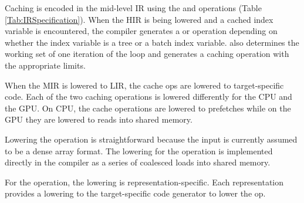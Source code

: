 Caching is encoded in the mid-level IR using the  and  operations (Table \ref{Tab:IRSpecification}). 
When the HIR is being lowered and a cached index variable is 
encountered, the compiler generates a  or  operation depending on 
whether the index variable is a tree or a batch index variable.
\Treebeard{} also determines the working set of one iteration of the loop  
and generates a caching operation with the appropriate limits.


When the MIR is lowered to LIR, the cache ops are lowered to target-specific code. Each of 
the two caching operations is lowered differently for the CPU and the GPU. On CPU, the cache operations are lowered to prefetches while
on the GPU they are lowered to reads into shared memory.

Lowering the  operation is straightforward
because the input is currently assumed to be a dense
array format. The lowering for the  operation is 
implemented directly in the \Treebeard{} compiler as a series of 
coalesced loads into shared memory.

For the  operation, the lowering is representation-specific. Each representation
provides a lowering to the target-specific code 
generator to lower the  op.
